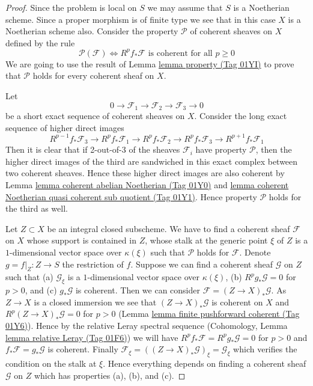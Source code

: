 \documentclass{amsart}
\theoremstyle{plain}
\theoremstyle{definition}
\theoremstyle{remark}
\numberwithin{equation}{subsection}
\begin{document}
\begin{proof}
Since the problem is local on $S$ we may assume that $S$ is
a Noetherian scheme. Since a proper morphism is of finite type
we see that in this case $X$ is a Noetherian scheme also.
Consider the property $\mathcal{P}$ of coherent sheaves
on $X$ defined by the rule
$$
\mathcal{P}(\mathcal{F}) \Leftrightarrow
R^pf_*\mathcal{F}\text{ is coherent for all }p \geq 0
$$
We are going to use the result of
Lemma \href{https://stacks.math.columbia.edu/tag/01YI}{lemma property (Tag 01YI)} to prove that
$\mathcal{P}$ holds for every coherent sheaf on $X$.

\medskip\noindent
Let
$$
0 \to \mathcal{F}_1 \to \mathcal{F}_2 \to \mathcal{F}_3 \to 0
$$
be a short exact sequence of coherent sheaves on $X$.
Consider the long exact sequence of higher direct images
$$
R^{p - 1}f_*\mathcal{F}_3 \to
R^pf_*\mathcal{F}_1 \to
R^pf_*\mathcal{F}_2 \to
R^pf_*\mathcal{F}_3 \to
R^{p + 1}f_*\mathcal{F}_1
$$
Then it is clear that if 2-out-of-3 of the sheaves $\mathcal{F}_i$
have property $\mathcal{P}$, then the higher direct images of the
third are sandwiched in this exact complex between two coherent
sheaves. Hence these higher direct images are also coherent by
Lemma \href{https://stacks.math.columbia.edu/tag/01Y0}{lemma coherent abelian Noetherian (Tag 01Y0)} and
\href{https://stacks.math.columbia.edu/tag/01Y1}{lemma coherent Noetherian quasi coherent sub quotient (Tag 01Y1)}.
Hence property $\mathcal{P}$ holds for the third as well.

\medskip\noindent
Let $Z \subset X$ be an integral closed subscheme.
We have to find a coherent sheaf $\mathcal{F}$ on $X$ whose support is
contained in $Z$, whose stalk at the generic point $\xi$ of $Z$ is a
$1$-dimensional vector space over $\kappa(\xi)$ such that $\mathcal{P}$
holds for $\mathcal{F}$. Denote $g = f|_Z : Z \to S$ the restriction of $f$.
Suppose we can find a coherent sheaf $\mathcal{G}$ on $Z$ such
that
(a) $\mathcal{G}_\xi$ is a $1$-dimensional vector space over $\kappa(\xi)$,
(b) $R^pg_*\mathcal{G} = 0$ for $p > 0$, and
(c) $g_*\mathcal{G}$ is coherent. Then we can consider
$\mathcal{F} = (Z \to X)_*\mathcal{G}$. As $Z \to X$ is a closed immersion
we see that $(Z \to X)_*\mathcal{G}$ is coherent on $X$
and $R^p(Z \to X)_*\mathcal{G} = 0$ for $p > 0$
(Lemma \href{https://stacks.math.columbia.edu/tag/01Y6}{lemma finite pushforward coherent (Tag 01Y6)}).
Hence by the relative Leray spectral sequence
(Cohomology, Lemma \href{https://stacks.math.columbia.edu/tag/01F6}{lemma relative Leray (Tag 01F6)})
we will have $R^pf_*\mathcal{F} = R^pg_*\mathcal{G} = 0$ for $p > 0$
and $f_*\mathcal{F} = g_*\mathcal{G}$ is coherent.
Finally $\mathcal{F}_\xi = ((Z \to X)_*\mathcal{G})_\xi = \mathcal{G}_\xi$
which verifies the condition on the stalk at $\xi$.
Hence everything depends on finding a coherent sheaf $\mathcal{G}$
on $Z$ which has properties (a), (b), and (c).


\end{proof}
\end{document}
